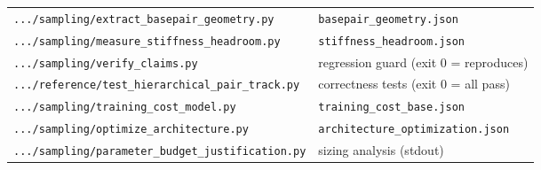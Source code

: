\documentclass[11pt,a4paper]{article}
\begin{document}
\begin{table}[h]
\begin{tabular}{@{}ll@{}}
\texttt{.../sampling/extract\_basepair\_geometry.py} & \texttt{basepair\_geometry.json} \\
\texttt{.../sampling/measure\_stiffness\_headroom.py} & \texttt{stiffness\_headroom.json} \\
\texttt{.../sampling/verify\_claims.py} & regression guard (exit 0 = reproduces) \\
\texttt{.../reference/test\_hierarchical\_pair\_track.py} & correctness tests (exit 0 = all pass) \\
\texttt{.../sampling/training\_cost\_model.py} & \texttt{training\_cost\_base.json} \\
\texttt{.../sampling/optimize\_architecture.py} & \texttt{architecture\_optimization.json} \\
\texttt{.../sampling/parameter\_budget\_justification.py} & sizing analysis (stdout) \\
\bottomrule
\end{tabular}
\end{table}
\end{document}
